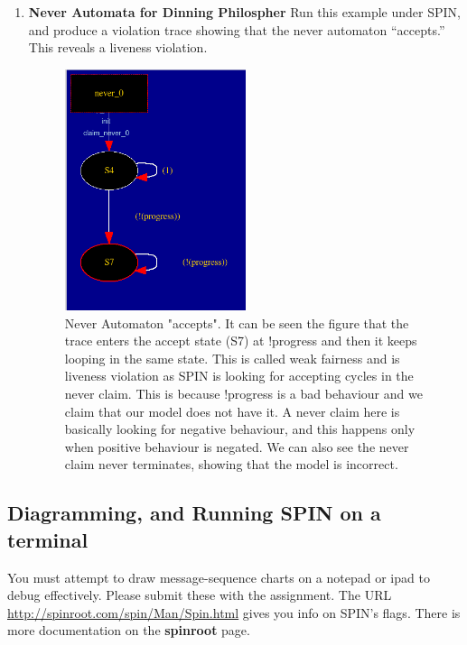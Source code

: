 \documentclass[10pt]{article}
\begin{document}
\begin{enumerate}
  \item \textbf{Never Automata for Dinning Philospher}
    Run this example under SPIN, and produce a violation trace showing that
    the never automaton ``accepts.'' This reveals a liveness violation.
    \begin{figure}[!h]
        \centering
        \includegraphics[width=0.5\textwidth]{never_phill.png}
        \caption{Never Automaton "accepts". It can be seen the figure that the trace enters the accept state (S7) at !progress and then it keeps looping in the same state. This is called weak fairness and is liveness violation as SPIN is looking for accepting cycles in the never claim. This is because !progress is a bad behaviour and we claim that our model does not have it. A never claim here is basically looking for negative behaviour, and this happens only when positive behaviour is negated. We can also see the never claim never terminates, showing that the model is incorrect. }
        \label{fig:my_label}
    \end{figure}
    
\end{enumerate}

    \clearpage
    
\subsection*{Diagramming, and Running SPIN on a terminal}

You must attempt to draw message-sequence charts on a notepad or ipad to debug effectively.
Please submit these with the assignment.
The URL \url{http://spinroot.com/spin/Man/Spin.html} gives you info on SPIN's flags.
There is more documentation on the {\bf spinroot} page.
\end{document}
